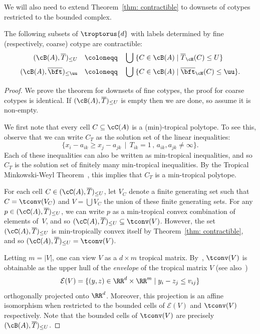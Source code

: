 We will also need to extend Theorem~\ref{thm: contractible} to downsets of cotypes restricted to the bounded complex.

\begin{prop} \label{prop: bounded+contractible}
The following subsets of $\troptorus{d}$ with labels determined by fine (respectively, coarse) cotype are contractible: 
\begin{align*}
    (\cB(A), \overline{T})_{\leq U} \quad &\coloneqq \quad \bigcup \; \{C\in \cB(A) \mid \overline{T}_\cH(C) \leq U\} \\
    (\cB(A), \overline\bft)_{\leq \uu} \quad &\coloneqq \quad \bigcup \; \{C\in \cB(A) \mid \overline\bft_\cH(C)\leq \uu\}.
\end{align*}
\end{prop}

\begin{proof}
We prove the theorem for downsets of fine cotypes, the proof for coarse cotypes is identical.
If $(\cB(A), \overline{T})_{\leq U}$ is empty then we are done, so assume it is non-empty.

We first note that every cell $C \subseteq \cC(A)$ is a (min)-tropical polytope.
To see this, observe that we can write $C_T$ as the solution set of the linear inequalities:
\[
\{x_i - a_{ik} \geq x_j - a_{jk} \, \mid \, T_{ik} = 1 \, , \, a_{ik}, a_{jk} \neq \infty \} .
\]
Each of these inequalities can also be written as min-tropical inequalities, and so $C_T$ is the solution set of finitely many min-tropical inequalities.
By the Tropical Minkowski-Weyl Theorem~\cite[Theorem 7.11]{JoswigBook22}, this implies that $C_T$ is a min-tropical polytope.

For each cell $C \in (\cC(A), \overline{T})_{\leq U}$, let $V_C$ denote a finite generating set such that $C = \tconv(V_C)$ and $V = \bigcup V_C$ the union of these finite generating sets.
For any $p \in (\cC(A), \overline{T})_{\leq U}$, we can write $p$ as a min-tropical convex combination of elements of~$V$, and so $(\cC(A), \overline{T})_{\leq U} \subseteq \tconv(V)$.
However, the set $(\cC(A), \overline{T})_{\leq U}$ is min-tropically convex itself by Theorem~\ref{thm: contractible}, and so $(\cC(A), \overline{T})_{\leq U} = \tconv(V)$.

Letting $m = |V|$, one can view $V$ as a $d \times m$ tropical matrix.
By~\cite[Theorem 33]{JoswigLoho:2016}, $\tconv(V)$ is obtainable as the upper hull of the \textit{envelope} of the tropical matrix $V$ (see also~\cite[Section 6.1]{JoswigBook22})
\[
    \mathcal{E}(V) = \{(y,z) \in \RR^d \times \RR^m \mid y_i - z_j \leq v_{ij}\}
\]
orthogonally projected onto $\RR^d$. 
Moreover, this projection is an affine isomorphism when restricted to the bounded cells of $\mathcal{E}(V)$ and $\tconv(V)$ respectively.
Note that the bounded cells of $\tconv(V)$ are precisely $(\cB(A), \overline{T})_{\leq U}$.


\end{proof}

